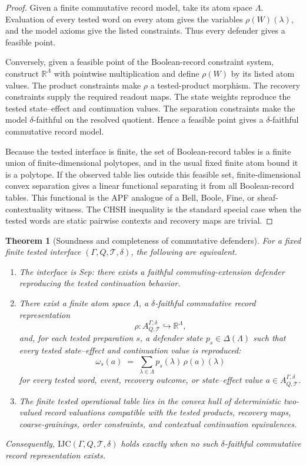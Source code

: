 \documentclass[11pt]{article}
\newtheorem{theorem}{Theorem}[section]
\newcommand{\IJC}{\mathrm{IJC}}
\newcommand{\R}{\mathbb R}
\begin{document}
\begin{proof}
Given a finite commutative record model, take its atom space $\Lambda$.
Evaluation of every tested word on every atom gives the variables
$\rho(W)(\lambda)$, and the model axioms give the listed constraints.
Thus every defender gives a feasible point.

Conversely, given a feasible point of the Boolean-record constraint
system, construct $\R^\Lambda$ with pointwise multiplication and define
$\rho(W)$ by its listed atom values.  The product constraints make
$\rho$ a tested-product morphism.  The recovery constraints supply the
required readout maps.  The state weights reproduce the tested
state--effect and continuation values.  The separation constraints make
the model $\delta$-faithful on the resolved quotient.  Hence a feasible
point gives a $\delta$-faithful commutative record model.

Because the tested interface is finite, the set of Boolean-record
tables is a finite union of finite-dimensional polytopes, and in the
usual fixed finite atom bound it is a polytope.  If the observed table
lies outside this feasible set, finite-dimensional convex separation
gives a linear functional separating it from all Boolean-record tables.
This functional is the APF analogue of a Bell, Boole, Fine, or
sheaf-contextuality witness.  The CHSH inequality is the standard
special case when the tested words are static pairwise contexts and
recovery maps are trivial.
\end{proof}

\begin{theorem}[Soundness and completeness of commutative defenders]\label{thm:soundness-completeness}
For a fixed finite tested interface $(\Gamma,Q,\mathcal T,\delta)$, the
following are equivalent.
\begin{enumerate}[label=(\arabic*),leftmargin=2em]
\item The interface is Sep: there exists a faithful commuting-extension
defender reproducing the tested continuation behavior.
\item There exist a finite atom space $\Lambda$, a $\delta$-faithful
commutative record representation
\[
    \rho:A^{\Gamma,\delta}_{Q,\mathcal T}
    \hookrightarrow \R^\Lambda,
\]
and, for each tested preparation $s$, a defender state
$p_s\in\Delta(\Lambda)$ such that every tested state--effect and
continuation value is reproduced:
\[
    \omega_s(a)
    \;=\;
    \sum_{\lambda\in\Lambda}p_s(\lambda)\,\rho(a)(\lambda)
\]
for every tested word, event, recovery outcome, or state--effect
value $a\in A^{\Gamma,\delta}_{Q,\mathcal T}$.
\item The finite tested operational table lies in the convex hull of
deterministic two-valued record valuations compatible with the tested
products, recovery maps, coarse-grainings, order constraints, and
contextual continuation equivalences.
\end{enumerate}
Consequently, $\IJC(\Gamma,Q,\mathcal T,\delta)$ holds exactly when
no such $\delta$-faithful commutative record representation exists.
\end{theorem}
\end{document}
